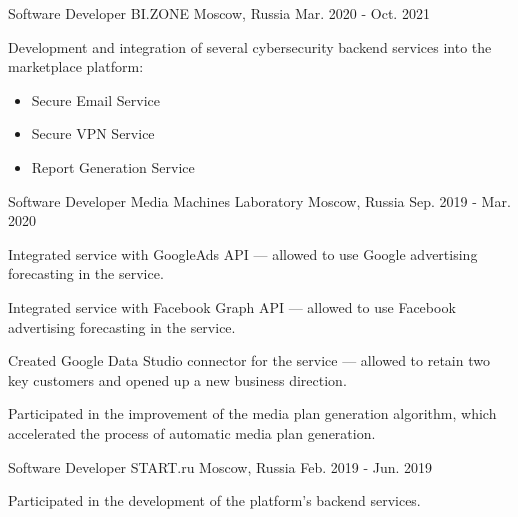 \begin{cventries}
  \cventry
    {Software Developer} %
    {BI.ZONE} %
    {Moscow, Russia} %
    {Mar. 2020 - Oct. 2021} %
    {
      \begin{cvitems} %
        \item {Development and integration of several cybersecurity backend services into the marketplace platform:}
        \begin{itemize}
          \item {Secure Email Service}
          \item {Secure VPN Service}
          \item {Report Generation Service}
        \end{itemize}
      \end{cvitems}
    }

  \cventry
    {Software Developer} %
    {Media Machines Laboratory} %
    {Moscow, Russia} %
    {Sep. 2019 - Mar. 2020} %
    {
      \begin{cvitems} %
        \item {Integrated service with GoogleAds API — allowed to use Google advertising forecasting in the service.}
        \item {Integrated service with Facebook Graph API — allowed to use Facebook advertising forecasting in the service.}
        \item {Created Google Data Studio connector for the service — allowed to retain two key customers and opened up a new business direction.}
        \item {Participated in the improvement of the media plan generation algorithm, which accelerated the process of automatic media plan generation.}
      \end{cvitems}
    }

  \cventry
    {Software Developer} %
    {START.ru} %
    {Moscow, Russia} %
    {Feb. 2019 - Jun. 2019} %
    {
      \begin{cvitems} %
        \item {Participated in the development of the platform's backend services.}
      \end{cvitems}
    }


\end{cventries}
